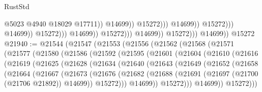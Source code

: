 \begin{lexlean}{RustStd}
\begin{coremodule}
                                                              @5023
                                                              @4940
                                                              @18029
                                                              @17711))
                                                          @14699))
                                                      @15272)))
                                                @14699))
                                            @15272)))
                                      @14699))
                                  @15272)))
                            @14699))
                        @15272)))
                  @14699))
              @15272)))
        @14699))
    @15272
@21940 := @21544
    (@21547
      (@21553
        (@21556
          (@21562
            (@21568
              (@21571
                (@21577
                  (@21580
                    (@21586
                      (@21592
                        (@21595
                          (@21601
                            (@21604
                              (@21610
                                (@21616
                                  (@21619
                                    (@21625
                                      (@21628
                                        (@21634
                                          (@21640
                                            (@21643
                                              (@21649
                                                (@21652
                                                  (@21658
                                                    (@21664
                                                      (@21667
                                                        (@21673
                                                          (@21676
                                                            (@21682
                                                              (@21688
                                                                (@21691
                                                                  (@21697
                                                                    (@21700 (@21706 @21892))
                                                                    @14699))
                                                                @15272)))
                                                          @14699))
                                                      @15272)))
                                                @14699))
                                            @15272)))

\end{coremodule}
\end{lexlean}
